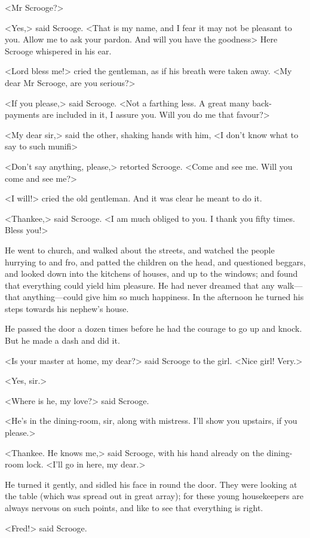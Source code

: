 <Mr Scrooge?>

<Yes,> said Scrooge. <That is my name, and I fear it may not be pleasant to you.
Allow me to ask your pardon. And will you have the goodness\longdash> Here
Scrooge whispered in his ear.

<Lord bless me!> cried the gentleman, as if his breath were taken away. <My dear
Mr Scrooge, are you serious?>

<If you please,> said Scrooge. <Not a farthing less. A great many back-payments
are included in it, I assure you. Will you do me that favour?>

<My dear sir,> said the other, shaking hands with him, <I don't know what to say
to such munifi\longdash>

<Don't say anything, please,> retorted Scrooge. <Come and see me. Will you come
and see me?>

<I will!> cried the old gentleman. And it was clear he meant to do it.

<Thankee,> said Scrooge. <I am much obliged to you. I thank you fifty times.
Bless you!>

He went to church, and walked about the streets, and watched the people hurrying
to and fro, and patted the children on the head, and questioned beggars, and
looked down into the kitchens of houses, and up to the windows; and found that
everything could yield him pleasure. He had never dreamed that any walk—that
anything—could give him so much happiness. In the afternoon he turned his steps
towards his nephew's house.

He passed the door a dozen times before he had the courage to go up and knock.
But he made a dash and did it.

<Is your master at home, my dear?> said Scrooge to the girl. <Nice girl! Very.>

<Yes, sir.>

<Where is he, my love?> said Scrooge.

<He's in the dining-room, sir, along with mistress. I'll show you upstairs, if
you please.>

<Thankee. He knows me,> said Scrooge, with his hand already on the dining-room
lock. <I'll go in here, my dear.>

He turned it gently, and sidled his face in round the door. They were looking at
the table (which was spread out in great array); for these young housekeepers
are always nervous on such points, and like to see that everything is right.

<Fred!> said Scrooge.

